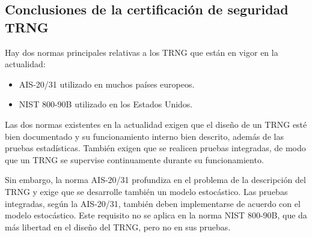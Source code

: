 		\subsection{Conclusiones de la certificación de seguridad TRNG}
		
            Hay dos normas principales relativas a los TRNG que están en vigor en la actualidad:
            
            \begin{itemize}[noitemsep]
                \item AIS-20/31 utilizado en muchos países europeos. \cite{AIS2011}
                \item NIST 800-90B utilizado en los Estados Unidos. \cite{Turan2018}
            \end{itemize}
        
            Las dos normas existentes en la actualidad exigen que el diseño de un TRNG esté bien documentado y su funcionamiento interno bien descrito, además de las pruebas estadísticas. También exigen que se realicen pruebas integradas, de modo que un TRNG se supervise continuamente durante su funcionamiento.
        
            Sin embargo, la norma AIS-20/31 profundiza en el problema de la descripción del TRNG y exige que se desarrolle también un modelo estocástico. Las pruebas integradas, según la AIS-20/31, también deben implementarse de acuerdo con el modelo estocástico. Este requisito no se aplica en la norma NIST 800-90B, que da más libertad en el diseño del TRNG, pero no en sus pruebas.

